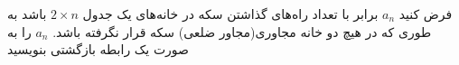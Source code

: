 \EXERCISE
فرض کنید 
$a_n$
 برابر با تعداد راه‌های گذاشتن سکه در خانه‌های یک جدول
$2 \times n$
 باشد به طوری که در
هیچ دو خانه مجاوری(مجاور ضلعی) سکه قرار نگرفته باشد.
$a_n$
 را به صورت یک رابطه بازگشتی بنویسید